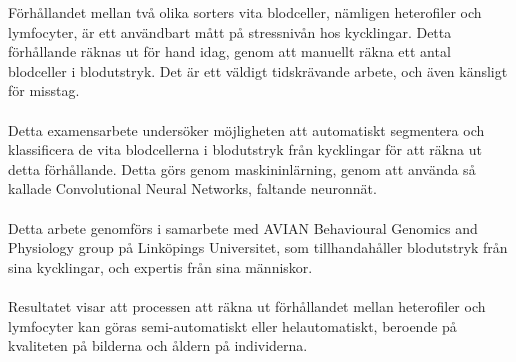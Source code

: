 Förhållandet mellan två olika sorters vita blodceller, nämligen heterofiler och lymfocyter, är ett användbart mått på stressnivån hos kycklingar. Detta förhållande räknas ut för hand idag, genom att manuellt räkna ett antal blodceller i blodutstryk. Det är ett väldigt tidskrävande arbete, och även känsligt för misstag.\\\\
Detta examensarbete undersöker möjligheten att automatiskt segmentera och klassificera de vita blodcellerna i blodutstryk från kycklingar för att räkna ut detta förhållande. Detta görs genom maskininlärning, genom att använda så kallade Convolutional Neural Networks, faltande neuronnät.\\\\
Detta arbete genomförs i samarbete med AVIAN Behavioural Genomics and Physiology group på Linköpings Universitet, som tillhandahåller blodutstryk från sina kycklingar, och expertis från sina människor.\\\\
Resultatet visar att processen att räkna ut förhållandet mellan heterofiler och lymfocyter kan göras semi-automatiskt eller helautomatiskt, beroende på kvaliteten på bilderna och åldern på individerna.